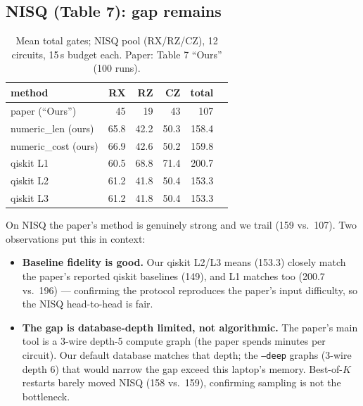 \documentclass[11pt,a4paper]{article}
\begin{document}
\subsection{NISQ (Table 7): gap remains}
\begin{table}[H]
\centering
\caption{Mean total gates; NISQ pool (RX/RZ/CZ), 12 circuits, 15\,s budget each. Paper: Table 7 ``Ours'' (100 runs).}
\label{tab:nisq}
\begin{tabular}{lrrrrr}
\toprule
method & RX & RZ & CZ & total \\
\midrule
paper (``Ours'')  & 45 & 19 & 43 & 107 \\
numeric\_len (ours)  & 65.8 & 42.2 & 50.3 & 158.4 \\
numeric\_cost (ours) & 66.9 & 42.6 & 50.2 & 159.8 \\
qiskit L1 & 60.5 & 68.8 & 71.4 & 200.7 \\
qiskit L2 & 61.2 & 41.8 & 50.4 & 153.3 \\
qiskit L3 & 61.2 & 41.8 & 50.4 & 153.3 \\
\bottomrule
\end{tabular}
\end{table}

On NISQ the paper's method is genuinely strong and we trail (159 vs.\ 107).
Two observations put this in context:
\begin{itemize}
    \item \textbf{Baseline fidelity is good.} Our qiskit L2/L3 means (153.3)
      closely match the paper's reported qiskit baselines (149), and L1 matches
      too (200.7 vs.\ 196) --- confirming the protocol reproduces the paper's
      input difficulty, so the NISQ head-to-head is fair.
    \item \textbf{The gap is database-depth limited, not algorithmic.} The
      paper's main tool is a 3-wire depth-5 compute graph (the paper spends
      minutes per circuit). Our default database matches that depth; the
      \texttt{--deep} graphs (3-wire depth 6) that would narrow the gap exceed
      this laptop's memory. Best-of-$K$ restarts barely moved NISQ (158 vs.\
      159), confirming sampling is not the bottleneck.
\end{itemize}
\end{document}
